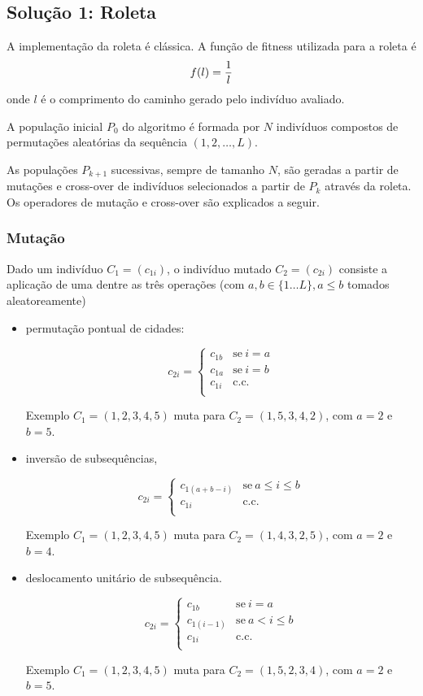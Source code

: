 \documentclass[a4paper]{article}
\begin{document}
\subsection{Solução 1: Roleta}

A implementação da roleta é clássica. A função de fitness utilizada para a roleta é
$$
f(l) = {1 \over l}
$$
onde $ l $ é o comprimento do caminho gerado pelo indivíduo avaliado.

A população inicial $ P_{0} $ do algoritmo é formada por $ N $ indivíduos compostos de permutações aleatórias da sequência $ (1,2,\dots,L) $.

As populações $ P_{k+1} $ sucessivas, sempre de tamanho $ N $, são geradas a partir de mutações e cross-over de indivíduos selecionados a partir de $ P_{k} $ através da roleta. Os operadores de mutação e cross-over são explicados a seguir.

\subsubsection{Mutação}
Dado um indivíduo $ C_1 = (c_{1i}) $, o indivíduo mutado $ C_2 = (c_{2i}) $ consiste a aplicação de uma dentre as três operações (com $ a, b \in \{1 \dots L \}, a \leq b $ tomados aleatoreamente)
\begin{itemize}
 \item permutação pontual de cidades:

$$
c_{2i} = 
\left\{
\begin{array}{ll}
  c_{1b} & \textrm{se}~ i=a \\
  c_{1a} & \textrm{se}~ i=b \\
  c_{1i} & \textrm{c.c.} \\
\end{array}
\right.
$$

\textsf{Exemplo} $ C_1 = (1, 2, 3, 4, 5) $ muta para $ C_2 = (1, 5, 3, 4, 2) $, com $ a = 2 $ e $b = 5 $.

\item inversão de subsequências,

$$
c_{2i} = 
\left\{
\begin{array}{ll}
  c_{1(a+b-i)} & \textrm{se}~ a \leq i \leq b \\
  c_{1i} & \textrm{c.c.} \\
\end{array}
\right.
$$

\textsf{Exemplo} $ C_1 = (1, 2, 3, 4, 5) $ muta para $ C_2 = (1, 4, 3, 2, 5) $, com $ a = 2 $ e $b = 4 $.

 \item deslocamento unitário de subsequência. 

$$
c_{2i} = 
\left\{
\begin{array}{ll}
  c_{1b} & \textrm{se}~ i=a \\
  c_{1(i-1)} & \textrm{se}~ a < i \leq b \\
  c_{1i} & \textrm{c.c.} \\
\end{array}
\right.
$$

\textsf{Exemplo} $ C_1 = (1, 2, 3, 4, 5) $ muta para $ C_2 = (1, 5, 2, 3, 4) $, com $ a = 2 $ e $b = 5 $.

\end{itemize}
\end{document}
